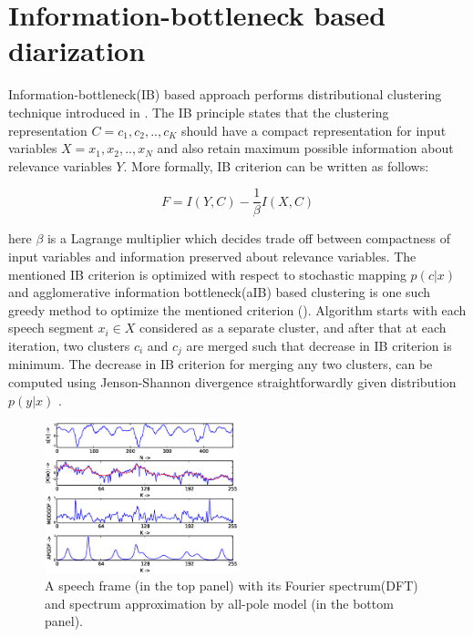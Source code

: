 \documentclass[conference]{IEEEtran}
\begin{document}
\section{Information-bottleneck based diarization}
\label{system}

Information-bottleneck(IB) based approach performs distributional clustering technique introduced in \cite{aIB}. The IB principle states that the clustering representation $C = {c_1,c_2,..,c_K}$ should have a compact representation for input variables $X = {x_1,x_2,..,x_N}$ and also retain maximum possible information about relevance variables $Y$. More formally, IB criterion can be written as follows:

\begin{equation}
\label{eq:aIB}
F = I(Y,C) - \frac{1}{\beta}I(X,C) 
\end{equation} 

here $\beta$ is a Lagrange multiplier which decides trade off between compactness of input variables and information preserved about relevance variables. The mentioned IB criterion is optimized with respect to stochastic mapping $p(c|x)$ and agglomerative information bottleneck(aIB) based clustering is one such greedy method to optimize the mentioned criterion (\cite{aIB}). Algorithm starts with each speech segment $x_i \in X$ considered as a separate cluster, and after that at each iteration, two clusters $c_i$ and $c_j$ are merged such that decrease in IB criterion is minimum. The decrease in IB criterion for merging any two clusters, can be computed using Jenson-Shannon divergence straightforwardly given distribution $p(y|x)$ \cite{aIB2}.

\begin{figure}[h]
\centering
\includegraphics[width=0.5\textwidth]{figures/apSpectrum.eps}
\caption{A speech frame (in the top panel) with its Fourier spectrum(DFT) and spectrum approximation by all-pole model (in the bottom panel).}
\label{fig:all-pole}
\end{figure}
\end{document}
